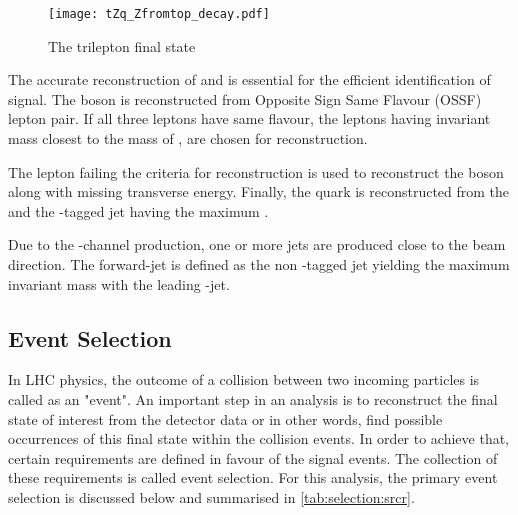 \begin{figure}
  \centering
      \texttt{[image: tZq\_Zfromtop\_decay.pdf]}
      \caption{The \tZq trilepton final state}
         \label{fig:tZqtrilep}
\end{figure}

The accurate reconstruction of \Ptop and \PZ is essential for the efficient identification of signal. 
The \PZ boson is reconstructed from Opposite Sign Same Flavour (OSSF) lepton pair. If all three
leptons have same flavour, the leptons having invariant mass closest to the mass of \PZ, are chosen
for \PZ reconstruction. 

The lepton failing the criteria for \PZ reconstruction is used to reconstruct the \PW boson along with
missing transverse energy. Finally, the \Ptop quark is reconstructed from the \PW and the \Pbottom-tagged
jet having the maximum \pT.

Due to the \Ptop-channel production, one or more jets are produced close to the beam direction. The
forward-jet is defined as the non \Pbottom-tagged jet yielding the maximum invariant mass with the 
leading \Pbottom-jet.

\subsection{Event Selection}
\label{sec:evsel}
In LHC physics, the outcome of a collision between two incoming particles is called as an "event".
An important step in an analysis is to reconstruct the final state of interest from the detector data or in other words, find
possible occurrences of this final state within the collision events. In order to achieve that,
certain requirements are defined in favour of the signal events. The collection of these requirements
is called event selection. For this analysis, the primary event selection is discussed below and
summarised in \cref{tab:selection:srcr}.

